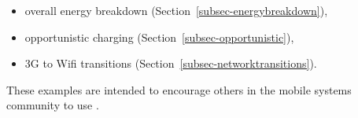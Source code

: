 \begin{itemize}

\item overall energy breakdown (Section~\ref{subsec-energybreakdown}),

\item opportunistic charging (Section~\ref{subsec-opportunistic}),

\item 3G to Wifi transitions (Section~\ref{subsec-networktransitions}).

\end{itemize}

These examples are intended to encourage others in the mobile systems
community to use \PhoneLab{}.
